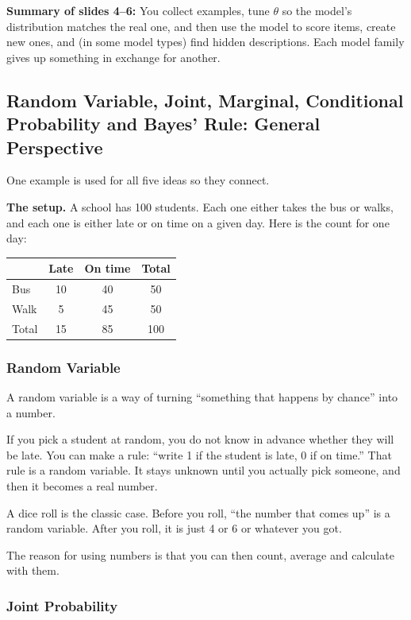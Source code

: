 \textbf{Summary of slides 4--6:} You collect examples, tune $\theta$ so the model's distribution matches the real one, and then use the model to score items, create new ones, and (in some model types) find hidden descriptions. Each model family gives up something in exchange for another.

\subsection*{Random Variable, Joint, Marginal, Conditional Probability and Bayes' Rule: General Perspective}

One example is used for all five ideas so they connect.

\textbf{The setup.} A school has 100 students. Each one either takes the bus or walks, and each one is either late or on time on a given day. Here is the count for one day:

\begin{tabular}{@{}lccc@{}}
\toprule
 & \textbf{Late} & \textbf{On time} & \textbf{Total} \\
\midrule
Bus & 10 & 40 & 50 \\
Walk & 5 & 45 & 50 \\
\midrule
Total & 15 & 85 & 100 \\
\bottomrule
\end{tabular}

\subsubsection*{Random Variable}

A random variable is a way of turning ``something that happens by chance'' into a number.

If you pick a student at random, you do not know in advance whether they will be late. You can make a rule: ``write 1 if the student is late, 0 if on time.'' That rule is a random variable. It stays unknown until you actually pick someone, and then it becomes a real number.

A dice roll is the classic case. Before you roll, ``the number that comes up'' is a random variable. After you roll, it is just 4 or 6 or whatever you got.

The reason for using numbers is that you can then count, average and calculate with them.

\subsubsection*{Joint Probability}

